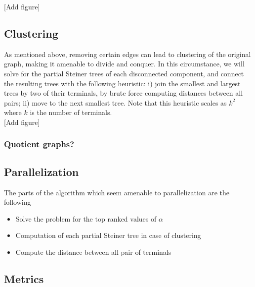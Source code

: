 \documentclass[12pt]{article}
\def\TA#1{{\color{red}{[#1]}}}
\begin{document}
[Add figure]

\subsection{Clustering}

As mentioned above, removing certain edges can lead to clustering of the original graph, making it amenable to divide and conquer. 
In this circumstance, we will solve for the partial Steiner trees of each disconnected component, and connect the resulting trees with the following heuristic: i) join the smallest and largest trees by two of their terminals, by brute force computing distances between all pairs; 
ii) move to the next smallest tree. Note that this heuristic scales as $k^2$ where $k$ is the number of terminals. \\

[Add figure]

\subsubsection{Quotient graphs?}

\TA{Pato?}

\subsection{Parallelization}


The parts of the algorithm which seem amenable to parallelization are the following

\begin{itemize}

\item Solve the problem for the top ranked values of $\alpha$

\item Computation of each partial Steiner tree in case of clustering

\item Compute the distance between all pair of terminals

\end{itemize}


\subsection{Metrics}
\end{document}
